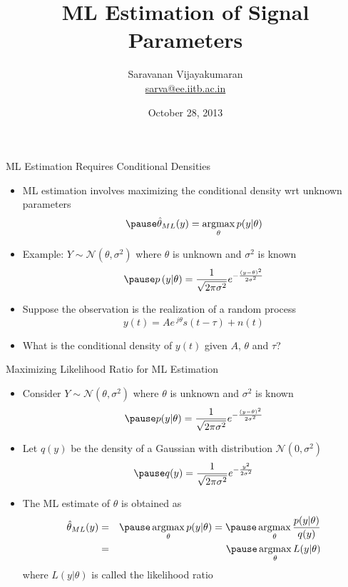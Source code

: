\documentclass[t]{beamer}
\title[EE 703 DMT]{ML Estimation of Signal Parameters}
\author[Saravanan V]
{
  Saravanan Vijayakumaran\\
  \href{mailto:sarva@ee.iitb.ac.in}{sarva@ee.iitb.ac.in}
}
\institute[IIT Bombay]
{
  Department of Electrical Engineering\\
  Indian Institute of Technology Bombay
}
\date{October 28, 2013}
\newcommand{\argmax}{\operatornamewithlimits{argmax}}
\begin{document}
\begin{frame}
  \titlepage
\end{frame}

\begin{frame}{ML Estimation Requires Conditional Densities}
  \footnotesize
  \begin{itemize}
    \item ML estimation involves maximizing the conditional density wrt unknown parameters
      \begin{equation*}
        \pause \hat{\theta}_{ML}(y) = \argmax_{\theta} p(y|\theta)
      \end{equation*}
    \item \pause Example: $Y \sim \mathcal{N}(\theta, \sigma^2)$ where $\theta$ is unknown and $\sigma^2$ is known 
      \begin{equation*}
        \pause p\left(y | \theta \right) = \frac{1}{\sqrt{2\pi \sigma^2}} e^{-\frac{(y-\theta)^2}{2\sigma^2}}
      \end{equation*}
    \item \pause Suppose the observation is the realization of a random process
      \begin{equation*}
        y(t) = Ae^{\ j\theta}s(t-\tau) + n(t)
      \end{equation*}
    \item \pause What is the conditional density of $y(t)$ given $A$, $\theta$ and $\tau$?
  \end{itemize}
  \normalsize
\end{frame}

\begin{frame}{Maximizing Likelihood Ratio for ML Estimation}
  \footnotesize
  \begin{itemize}
    \item Consider $Y \sim \mathcal{N}(\theta, \sigma^2)$ where $\theta$ is unknown and $\sigma^2$ is known 
      \begin{equation*}
        \pause p(y | \theta) = \frac{1}{\sqrt{2\pi \sigma^2}} e^{-\frac{(y-\theta)^2}{2\sigma^2}}
      \end{equation*}
    \item \pause Let $q(y)$ be the density of a Gaussian with distribution $\mathcal{N}(0, \sigma^2)$
      \begin{equation*}
        \pause q(y) = \frac{1}{\sqrt{2\pi \sigma^2}} e^{-\frac{y^2}{2\sigma^2}}
      \end{equation*}
    \item \pause The ML estimate of $\theta$ is obtained as
      \begin{eqnarray*}
        \hat{\theta}_{ML}(y) & = & \pause \argmax_{\theta} p( y | \theta) = \pause \argmax_{\theta} \frac{p(y|\theta)}{q(y)} \\
                                      & = & \pause \argmax_{\theta} L(y|\theta) 
      \end{eqnarray*}
      where $L(y|\theta)$ is called the likelihood ratio
  \end{itemize}
  \normalsize
\end{frame}
\end{document}
